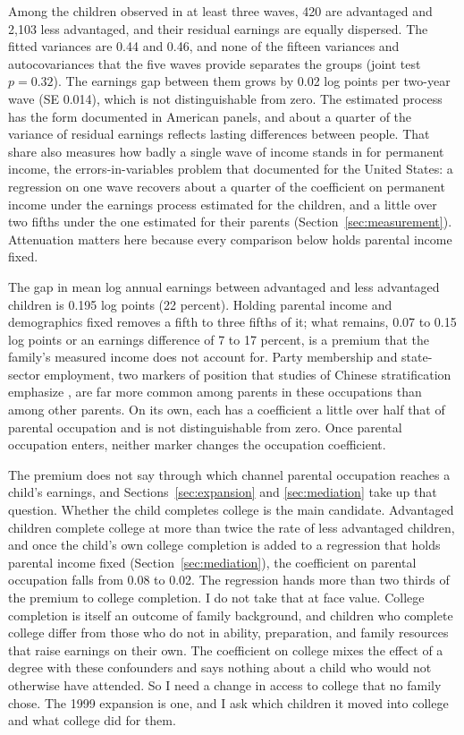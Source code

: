 \documentclass[11pt]{article}
\begin{document}
Among the children observed in at least three waves, 420 are advantaged and 2,103 less advantaged, and their residual earnings are equally dispersed. The fitted variances are 0.44 and 0.46, and none of the fifteen
variances and autocovariances that the five waves provide separates the groups (joint test $p = 0.32$). The earnings gap between them grows by 0.02 log points per two-year wave (SE 0.014), which is not distinguishable from zero. The estimated
process has the form documented in American panels, and about a quarter of the variance of residual
earnings reflects lasting differences between people. That share also measures how badly a single wave of income stands in for permanent income, the errors-in-variables problem that \citet{Solon1992}
documented for the United States: a regression on one wave recovers about a quarter of the
coefficient on permanent income under the earnings process estimated for the children, and a little over two fifths under the one estimated for their parents (Section~\ref{sec:measurement}). Attenuation matters here because every comparison below holds parental income fixed.

The gap in mean log annual earnings between advantaged and less advantaged
children is 0.195 log points (22 percent). Holding parental income and demographics fixed removes a fifth to three fifths of it; what remains, 0.07 to 0.15 log points or an earnings difference of 7 to 17 percent, is a premium that the family's measured income does not account for. Party membership and state-sector employment, two markers of position that
studies of Chinese stratification emphasize \citep{LiEtAl2007,
WalderLiTreiman2000}, are far more common among parents in these occupations than among other parents. On its own, each has a coefficient a little over half that of parental occupation and is not distinguishable from zero. Once parental occupation enters, neither marker changes the occupation coefficient.

The premium does not say through which channel parental occupation reaches a child's earnings, and Sections~\ref{sec:expansion} and \ref{sec:mediation} take up that question. Whether the child completes college is the main candidate. Advantaged children complete college at more than twice the rate of less advantaged children, and once the child's own college completion is added to a regression that holds parental income fixed (Section~\ref{sec:mediation}), the coefficient on parental occupation falls from 0.08 to 0.02. The regression hands more than two thirds of the premium to college completion. I do not take that at face value. College completion is
itself an outcome of family background, and children who complete college differ from those who do not in ability, preparation, and family resources that raise earnings on their own. The coefficient on college mixes the effect of a degree with these confounders and says nothing about a child who would not otherwise have
attended. So I need a change in access to college that no family chose. The 1999
expansion is one, and I ask which children it moved into
college and what college did for them.
\end{document}

